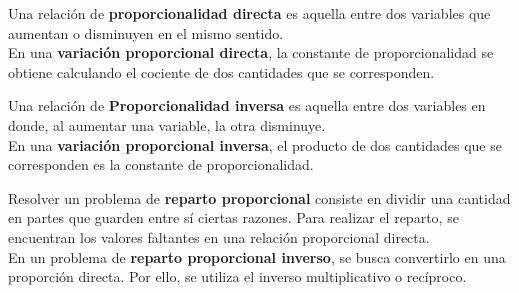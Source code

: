 \begin{tcolorbox}[
        colback=colorrds!5!white,
        colframe=colorrds!35!white,
        coltitle=black,
        fonttitle=\bfseries,
        center title,
        title=Proporcionalidad]

    Una relación de \textbf{proporcionalidad directa} es aquella entre dos variables que aumentan o disminuyen en el mismo sentido.\\

    En una \textbf{variación proporcional directa}, la constante de proporcionalidad se obtiene
    calculando el cociente de dos cantidades que se corresponden.

    \DrawLine

    Una relación de \textbf{Proporcionalidad inversa}  es aquella entre dos variables en donde, al aumentar una variable, la otra disminuye.\\

    En una \textbf{variación proporcional inversa}, el producto de dos cantidades que se
    corresponden es la constante de proporcionalidad.


    \DrawLine

    Resolver un problema de \textbf{reparto proporcional} consiste en dividir una cantidad en
    partes que guarden entre sí ciertas razones. Para realizar el reparto, se encuentran
    los valores faltantes en una relación proporcional directa.\\

    En un problema de \textbf{reparto proporcional inverso}, se busca convertirlo en una proporción directa. Por ello, se utiliza el inverso multiplicativo o recíproco.

\end{tcolorbox}



